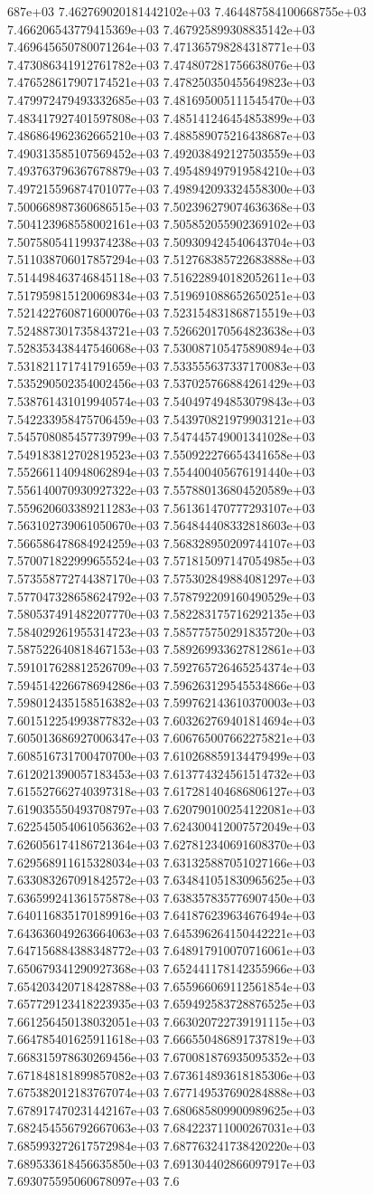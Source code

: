 687e+03	7.462769020181442102e+03	7.464487584100668755e+03	7.466206543779415369e+03	7.467925899308835142e+03	7.469645650780071264e+03	7.471365798284318771e+03	7.473086341912761782e+03	7.474807281756638076e+03	7.476528617907174521e+03	7.478250350455649823e+03	7.479972479493332685e+03	7.481695005111545470e+03	7.483417927401597808e+03	7.485141246454853899e+03	7.486864962362665210e+03	7.488589075216438687e+03	7.490313585107569452e+03	7.492038492127503559e+03	7.493763796367678879e+03	7.495489497919584210e+03	7.497215596874701077e+03	7.498942093324558300e+03	7.500668987360686515e+03	7.502396279074636368e+03	7.504123968558002161e+03	7.505852055902369102e+03	7.507580541199374238e+03	7.509309424540643704e+03	7.511038706017857294e+03	7.512768385722683888e+03	7.514498463746845118e+03	7.516228940182052611e+03	7.517959815120069834e+03	7.519691088652650251e+03	7.521422760871600076e+03	7.523154831868715519e+03	7.524887301735843721e+03	7.526620170564823638e+03	7.528353438447546068e+03	7.530087105475890894e+03	7.531821171741791659e+03	7.533555637337170083e+03	7.535290502354002456e+03	7.537025766884261429e+03	7.538761431019940574e+03	7.540497494853079843e+03	7.542233958475706459e+03	7.543970821979903121e+03	7.545708085457739799e+03	7.547445749001341028e+03	7.549183812702819523e+03	7.550922276654341658e+03	7.552661140948062894e+03	7.554400405676191440e+03	7.556140070930927322e+03	7.557880136804520589e+03	7.559620603389211283e+03	7.561361470777293107e+03	7.563102739061050670e+03	7.564844408332818603e+03	7.566586478684924259e+03	7.568328950209744107e+03	7.570071822999655524e+03	7.571815097147054985e+03	7.573558772744387170e+03	7.575302849884081297e+03	7.577047328658624792e+03	7.578792209160490529e+03	7.580537491482207770e+03	7.582283175716292135e+03	7.584029261955314723e+03	7.585775750291835720e+03	7.587522640818467153e+03	7.589269933627812861e+03	7.591017628812526709e+03	7.592765726465254374e+03	7.594514226678694286e+03	7.596263129545534866e+03	7.598012435158516382e+03	7.599762143610370003e+03	7.601512254993877832e+03	7.603262769401814694e+03	7.605013686927006347e+03	7.606765007662275821e+03	7.608516731700470700e+03	7.610268859134479499e+03	7.612021390057183453e+03	7.613774324561514732e+03	7.615527662740397318e+03	7.617281404686806127e+03	7.619035550493708797e+03	7.620790100254122081e+03	7.622545054061056362e+03	7.624300412007572049e+03	7.626056174186721364e+03	7.627812340691608370e+03	7.629568911615328034e+03	7.631325887051027166e+03	7.633083267091842572e+03	7.634841051830965625e+03	7.636599241361575878e+03	7.638357835776907450e+03	7.640116835170189916e+03	7.641876239634676494e+03	7.643636049263664063e+03	7.645396264150442221e+03	7.647156884388348772e+03	7.648917910070716061e+03	7.650679341290927368e+03	7.652441178142355966e+03	7.654203420718428788e+03	7.655966069112561854e+03	7.657729123418223935e+03	7.659492583728876525e+03	7.661256450138032051e+03	7.663020722739191115e+03	7.664785401625911618e+03	7.666550486891737819e+03	7.668315978630269456e+03	7.670081876935095352e+03	7.671848181899857082e+03	7.673614893618185306e+03	7.675382012183767074e+03	7.677149537690284888e+03	7.678917470231442167e+03	7.680685809900989625e+03	7.682454556792667063e+03	7.684223711000267031e+03	7.685993272617572984e+03	7.687763241738420220e+03	7.689533618456635850e+03	7.691304402866097917e+03	7.693075595060678097e+03	7.6